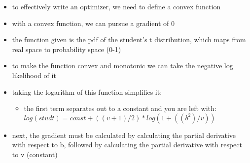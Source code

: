 \documentclass[11pt]{article}
\begin{document}
\begin{itemize}
\item to effectively write an optimizer, we need to define a convex function
\item with a convex function, we can pursue a gradient of 0
\item the function given is the pdf of the student's t distribution, which maps from real space to probability space (0-1)
\item to make the function convex and monotonic we can take the negative log likelihood of it
\item taking the logarithm of this function simplifies it:
\begin{itemize}
\item the first term separates out to a constant and you are left with: \(log(studt) = const + ((v+1)/2) * log(1+((b^2)/v))\)
\end{itemize}
\item next, the gradient must be calculated by calculating the partial derivative with respect to b, followed by calculating the partial derivative with respect to v (constant)
\end{itemize}
\end{document}
